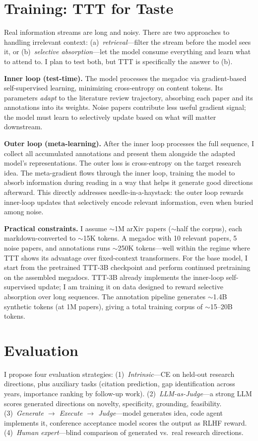 \documentclass[10pt]{article}
\begin{document}
\section{Training: TTT for Taste}

Real information streams are long and noisy. There are two approaches to handling irrelevant context: (a)~\textit{retrieval}---filter the stream before the model sees it, or (b)~\textit{selective absorption}---let the model consume everything and learn what to attend to. I plan to test both, but TTT is specifically the answer to (b).

\textbf{Inner loop (test-time).} The model processes the megadoc via gradient-based self-supervised learning, minimizing cross-entropy on content tokens. Its parameters \textit{adapt} to the literature review trajectory, absorbing each paper and its annotations into its weights. Noise papers contribute less useful gradient signal; the model must learn to selectively update based on what will matter downstream.

\textbf{Outer loop (meta-learning).} After the inner loop processes the full sequence, I collect all accumulated annotations and present them alongside the adapted model's representations. The outer loss is cross-entropy on the target research idea. The meta-gradient flows through the inner loop, training the model to absorb information during reading in a way that helps it generate good directions afterward. This directly addresses needle-in-a-haystack: the outer loop rewards inner-loop updates that selectively encode relevant information, even when buried among noise.

\textbf{Practical constraints.} I assume $\sim$1M arXiv papers ($\sim$half the corpus), each markdown-converted to $\sim$15K tokens. A megadoc with 10 relevant papers, 5 noise papers, and annotations runs $\sim$250K tokens---well within the regime where TTT shows its advantage over fixed-context transformers. For the base model, I start from the pretrained TTT-3B checkpoint \parencite{sun2024ttt} and perform continued pretraining on the assembled megadocs. TTT-3B already implements the inner-loop self-supervised update; I am training it on data designed to reward selective absorption over long sequences. The annotation pipeline generates $\sim$1.4B synthetic tokens (at 1M papers), giving a total training corpus of $\sim$15--20B tokens.

\section{Evaluation}

I propose four evaluation strategies: (1)~\textit{Intrinsic}---CE on held-out research directions, plus auxiliary tasks (citation prediction, gap identification across years, importance ranking by follow-up work). (2)~\textit{LLM-as-Judge}---a strong LLM scores generated directions on novelty, specificity, grounding, feasibility. (3)~\textit{Generate $\to$ Execute $\to$ Judge}---model generates idea, code agent implements it, conference acceptance model scores the output as RLHF reward. (4)~\textit{Human expert}---blind comparison of generated vs.\ real research directions.

{\footnotesize\printbibliography}
\end{document}
